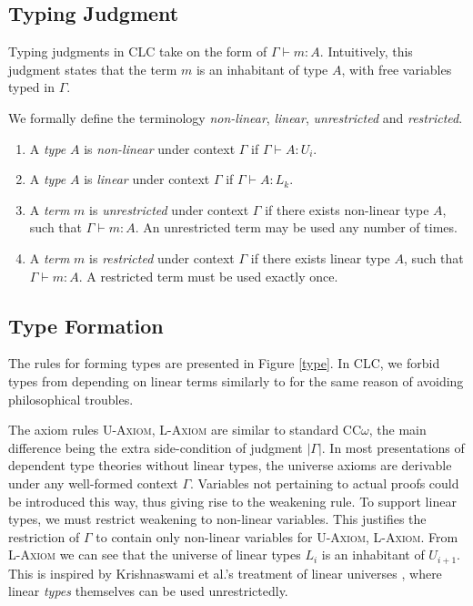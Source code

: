 \documentclass[sigplan,screen,review,anonymous]{acmart}
\newcommand{\rname}[1]{\textsc{\footnotesize #1}}
\newcommand{\pure}[1]{|#1|}
\begin{document}
\subsection{Typing Judgment}
Typing judgments in CLC take on the form of $\Gamma \vdash m : A$. Intuitively, this judgment states that the term $m$ is an inhabitant of type $A$, with free variables typed in $\Gamma$.

\begin{definition} We formally define the terminology \textit{non-linear}, \textit{linear}, \textit{unrestricted} and \textit{restricted}.
  \begin{enumerate}
    \item A \textit{type} $A$ is \textit{non-linear} under context $\Gamma$ if $\Gamma \vdash A : U_i$.
    \item A \textit{type} $A$ is \textit{linear} under context $\Gamma$ if $\Gamma \vdash A : L_k$.
    \item A \textit{term} $m$ is \textit{unrestricted} under context $\Gamma$ if there exists non-linear type $A$, such that $\Gamma \vdash m : A$. An unrestricted term may be used any number of times.
    \item A \textit{term} $m$ is \textit{restricted} under context $\Gamma$ if there exists linear type $A$, such that $\Gamma \vdash m : A$. A restricted term must be used exactly once.
  \end{enumerate}
\end{definition}

\subsection{Type Formation} \label{tyformation}
The rules for forming types are presented in Figure \ref{type}. In CLC, we forbid types from depending on linear terms similarly to \cite{llf,neel15} for the same reason of avoiding philosophical troubles.

The axiom rules \rname{U-Axiom}, \rname{L-Axiom} are similar to standard CC$\omega$, the main difference being the extra side-condition of judgment $\pure{\Gamma}$. In most presentations of dependent type theories without linear types, the universe axioms are derivable under any well-formed context $\Gamma$. Variables not pertaining to actual proofs could be introduced this way, thus giving rise to the weakening rule. To support linear types, we must restrict weakening to non-linear variables. This justifies the restriction of $\Gamma$ to contain only non-linear variables for \rname{U-Axiom}, \rname{L-Axiom}. From \rname{L-Axiom} we can see that the universe of linear types $L_i$ is an inhabitant of $U_{i+1}$. This is inspired by Krishnaswami et al.'s treatment of linear universes \cite{neel15}, where linear \textit{types} themselves can be used unrestrictedly.
\end{document}
